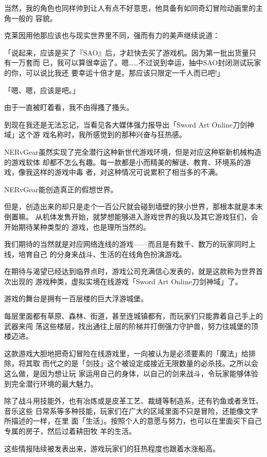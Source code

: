 \documentclass[11pt]{book}
\begin{document}
当然，我的角色也同样帅到让人有点不好意思，他具备有如同奇幻冒险动画里的主角一般的
容貌。

克莱因用他那应该也与现实世界里不同，强而有力的美声继续说道：

「说起来，应该是买了『SAO』后，才赶快去买了游戏机。因为第一批出货量只有一万套而
已，我可以算很幸运了。嗯……不过说到幸运，抽中SAO封闭测试玩家的你，可以说比我还
要幸运十倍才是。那应该只限定一千人而已吧!」

「嗯、嗯，应该是吧。」

由于一直被盯着看，我不由得搔了搔头。

到现在我还是无法忘记，当看见各大媒体强力报导出「Sword Art Online刀剑神域」这个游
戏名称时，我所感觉到的那种兴奋与狂热感。

NERvGear虽然实现了完全潜行这种新世代游戏环境，但是对应这种崭新机械构造的游戏软体
却都不怎么有趣。每一款都是小而精美的解谜、教育、环境系的游戏，像我这样的游戏中毒
者，对这种情况可说累积了相当多的不满。

NERvGear能创造真正的假想世界。

但是，创造出来的却只是走个一百公尺就会碰到墙壁的狭小世界，那根本就是本末倒置嘛。
从机体发售开始，就梦想能够进入游戏世界的我以及其它游戏狂们，会开始期待某种类型的
游戏，也是理所当然的。

我们期待的当然就是对应网络连线的游戏——而且是有数千、数万的玩家同时上线，培育自己
的分身来战斗、生活的在线角色扮演游戏。

在期待与渴望已经达到临界点时，游戏公司充满信心发表的，就是这款称为世界首次出现的
游戏种类，虚拟实境在线游戏「Sword Art Online刀剑神域」了。

游戏的舞台是拥有一百层楼的巨大浮游城堡。

每层里面都有草原、森林、街道，甚至连城镇都有，而玩家们只能靠着自己手上的武器来闯
荡这些楼层，找出通往上层的阶梯并打倒强力守护兽，努力往城堡的顶楼迈进。

这款游戏大胆地把奇幻冒险在线游戏里，一向被认为是必须要素的「魔法」给排除，将其取
而代之的是「剑技」这个被设定成接近无限数量的必杀技。之所以会这么做，是因为想让玩
家运用自己的身体，以自己的剑来战斗，令玩家能够体验到完全潜行环境的最大魅力。

除了战斗用技能外，也有冶炼或是皮革工艺、裁缝等制造系，还有钓鱼或者烹饪、音乐这些
日常系等多种技能，玩家们在广大的区域里面不只是冒险，还能像文字所描述的一样，在里
面「生活」。按照个人的意愿与努力，也可以在里面买下自己专属的房子，然后过着耕田牧
羊的生活。

这些情报陆续被发表出来，游戏玩家们的狂热程度也跟着水涨船高。
\end{document}
